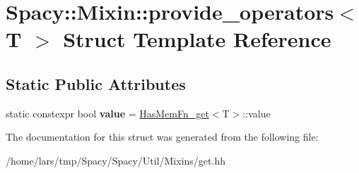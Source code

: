 \hypertarget{structSpacy_1_1Mixin_1_1provide__operators_3_01T_01_4}{}\section{Spacy\+:\+:Mixin\+:\+:provide\+\_\+operators$<$ T $>$ Struct Template Reference}
\label{structSpacy_1_1Mixin_1_1provide__operators_3_01T_01_4}
\subsection*{Static Public Attributes}
\begin{DoxyCompactItemize}
\item 
static constexpr bool {\bfseries value} = \hyperlink{structSpacy_1_1Mixin_1_1HasMemFn__get}{Has\+Mem\+Fn\+\_\+get}$<$T$>$\+::value\hypertarget{structSpacy_1_1Mixin_1_1provide__operators_3_01T_01_4_ad3976b342597e36d505666f3ac6adc84}{}\label{structSpacy_1_1Mixin_1_1provide__operators_3_01T_01_4_ad3976b342597e36d505666f3ac6adc84}

\end{DoxyCompactItemize}


The documentation for this struct was generated from the following file\+:\begin{DoxyCompactItemize}
\item 
/home/lars/tmp/\+Spacy/\+Spacy/\+Util/\+Mixins/get.\+hh\end{DoxyCompactItemize}
